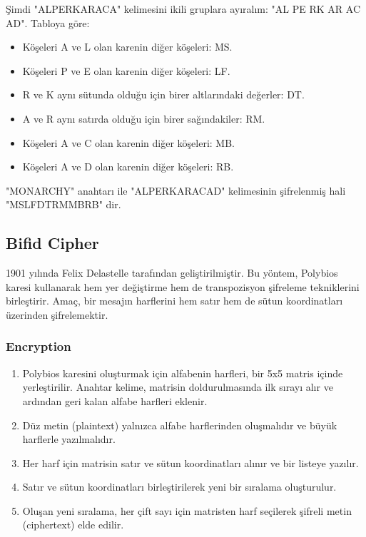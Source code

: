 Şimdi "ALPERKARACA" kelimesini ikili gruplara ayıralım: "AL PE RK AR AC AD". Tabloya göre:

\begin{itemize}
    \item Köşeleri A ve L olan karenin diğer köşeleri: MS.
    \item Köşeleri P ve E olan karenin diğer köşeleri: LF.
    \item R ve K aynı sütunda olduğu için birer altlarındaki değerler: DT.
    \item A ve R aynı satırda olduğu için birer sağındakiler: RM.
    \item Köşeleri A ve C olan karenin diğer köşeleri: MB.
    \item Köşeleri A ve D olan karenin diğer köşeleri: RB.
\end{itemize}

"MONARCHY" anahtarı ile "ALPERKARACAD" kelimesinin şifrelenmiş hali "MSLFDTRMMBRB" dir.

\newpage

\subsection{Bifid Cipher}

1901 yılında Felix Delastelle tarafından geliştirilmiştir. Bu yöntem, Polybios karesi kullanarak hem yer değiştirme hem de transpozisyon şifreleme tekniklerini birleştirir. Amaç, bir mesajın harflerini hem satır hem de sütun koordinatları üzerinden şifrelemektir. 

\subsubsection{Encryption}

\begin{enumerate}
    \item Polybios karesini oluşturmak için alfabenin harfleri, bir 5x5 matris içinde yerleştirilir. Anahtar kelime, matrisin doldurulmasında ilk sırayı alır ve ardından geri kalan alfabe harfleri eklenir.
    \item Düz metin (plaintext) yalnızca alfabe harflerinden oluşmalıdır ve büyük harflerle yazılmalıdır. 
    \item Her harf için matrisin satır ve sütun koordinatları alınır ve bir listeye yazılır.
    \item Satır ve sütun koordinatları birleştirilerek yeni bir sıralama oluşturulur.
    \item Oluşan yeni sıralama, her çift sayı için matristen harf seçilerek şifreli metin (ciphertext) elde edilir.
\end{enumerate}


